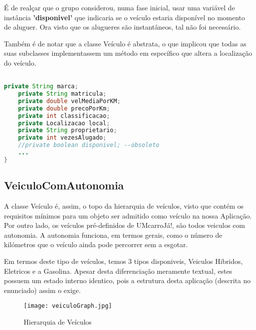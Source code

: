 \documentclass[a4paper,11pt]{report}
\begin{document}
\vspace{0.5cm}

É de realçar que o grupo considerou, numa fase inicial, usar uma variável de instância \textbf{'disponivel'} que indicaria se o veículo estaria disponível no momento de aluguer. Ora visto que os alugueres são instantâneos, tal não foi necessário.

Também é de notar que a classe Veículo é abstrata, o que implicou que todas as suas subclasses implementassem um método em específico que altera a localização do veículo.

\begin{lstlisting}[language=java]

private String marca;
    private String matricula;
    private double velMediaPorKM;
    private double precoPorKm;
    private int classificacao;
    private Localizacao local;
    private String proprietario;
    private int vezesAlugado;
    //private boolean disponivel; --obsoleto
    ...
}

\end{lstlisting}

\subsection{VeiculoComAutonomia}

\hspace{0.50cm} A classe Veículo é, assim, o topo da hierarquia de veículos, visto que contém os requisitos mínimos para um objeto ser admitido como veículo na nossa Aplicação.
Por outro lado, os veículos pré-definidos de UMcarroJá!, são todos veiculos com autonomia. A autonomia funciona, em termos gerais, como o número de kilómetros que o veículo ainda pode percorrer sem a esgotar.

\vspace{0.5cm}

Em termos deste tipo de veículos, temos 3 tipos disponiveis, Veiculos Hibridos, Eletricos e a Gasolina. Apesar desta diferenciação meramente textual, estes possuem um estado interno identico, pois a estrutura desta aplicação (descrita no enunciado) assim o exige.

    \begin{figure}[H]
    \vspace{0.5cm}
        \centering
        \texttt{[image: veiculoGraph.jpg]}
        \label{img:logo}
        \caption{Hierarquia de Veículos}
    \end{figure}
   
\end{document}
